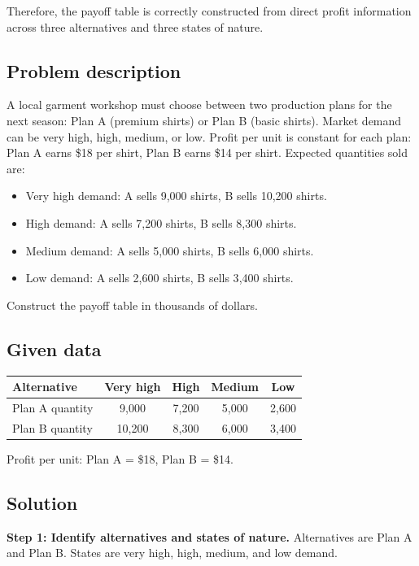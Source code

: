 \begin{ExamProblems}
		Therefore, the payoff table is correctly constructed from direct profit information across three alternatives and three states of nature.
		
		\item
		\subsection*{Problem description}
		A local garment workshop must choose between two production plans for the next season: Plan A (premium shirts)
		or Plan B (basic shirts). Market demand can be very high, high, medium, or low.
		Profit per unit is constant for each plan: Plan A earns \$18 per shirt, Plan B earns \$14 per shirt.
		Expected quantities sold are:
		\begin{itemize}
			\item Very high demand: A sells 9{,}000 shirts, B sells 10{,}200 shirts.
			\item High demand: A sells 7{,}200 shirts, B sells 8{,}300 shirts.
			\item Medium demand: A sells 5{,}000 shirts, B sells 6{,}000 shirts.
			\item Low demand: A sells 2{,}600 shirts, B sells 3{,}400 shirts.
		\end{itemize}
		Construct the payoff table in thousands of dollars.
		
		\subsection*{Given data}
		\begin{center}
			\begin{tabular}{l c c c c}
				\toprule
				Alternative & Very high & High & Medium & Low \\
				\midrule
				Plan A quantity & 9{,}000 & 7{,}200 & 5{,}000 & 2{,}600 \\
				Plan B quantity & 10{,}200 & 8{,}300 & 6{,}000 & 3{,}400 \\
				\bottomrule
			\end{tabular}
		\end{center}
		Profit per unit: Plan A = \$18, Plan B = \$14.
		
		\subsection*{Solution}
		\textbf{Step 1: Identify alternatives and states of nature.} Alternatives are Plan A and Plan B. States are very high, high, medium, and low demand.
		

\end{ExamProblems}

